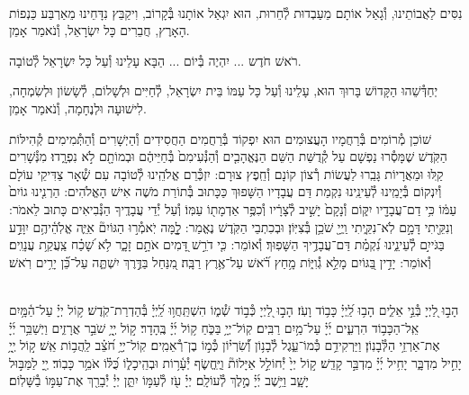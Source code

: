 \documentclass[twoside, openany, parskip=half, 11pt]{book}
\begin{document}
\\
נִסִּים לַאֲבוֹתֵינוּ, וְ֯גָאַל אוֹתָם מֵעַבְדוּת לְ֯חֵרוּת, הוּא יִגְאַל אוֹתָנוּ בְּ֯קָרוֹב, וִיקַבֵּץ נִדָּחֵינוּ מֵאַרְבַּע כַּנְפוֹת הָאָרֶץ, חֲבֵרִים כָּל יִשְׂרָאֵל, וְ֯נֹאמַר אָמֵן.

רֹאשׁ חֹדֶש ... יִהְיֶה בְּ֯יוֹם ... הַבָּא עָלֵינוּ וְ֯עַל כָּל יִשְׂרָאֵל לְ֯טוֹבָה.

יְחַדְּ֯שֵׁהוּ הַקָּדוֹשׁ בָּרוּךְ הוּא, עָלֵינוּ וְ֯עַל כָּל עַמּוֹ בֵּית יִשְׂרָאֵל, לְ֯חַיִּים וּלְשָׁלוֹם, לְ֯שָׂשׂוֹן וּלְשִׂמְחָה, לִישׁוּעָה וּלְנֶחָמָה, וְ֯נֹאמַר אָמֵן.

\sepline

שׁוֹכֵן מְ֯רוֹמִים בְּ֯רַחֲמָיו הָעֲצוּמִים הוּא יִפְקוֹד בְּ֯רַחֲמִים הַחֲסִידִים וְ֯הַיְשָׁרִים וְ֯הַתְּ֯מִימִים קְ֯הִילּוֹת הַקֹּֽדֶשׁ שֶׁמָּסְ֯רוּ נַפְשָׁם עַל קְ֯דֻשַּׁת הַשֵּׁם הַנֶּאֱהָבִ֤ים וְ֯הַנְּ֯עִימִם֙ בְּ֯חַיֵּיהֶ֔ם וּבְמוֹתָ֖ם לֹ֣א נִפְרָ֑דוּ׃ מִנְּ֯שָׁרִים קַֽלּוּ וּמֵאֲרָיוֹת גָּבֵֽרוּ לַעֲשׂוֹת רְ֯צוֹן קוֹנָם וְ֯חֵֽפֶץ צוּרָם: יִזְכְּ֯רֵם אֱלֹהֵֽינוּ לְ֯טוֹבָה עִם שְׁ֯אָר צַדִּיקֵי עוֹלָם וְ֯יִנְקוֹם בְּ֯יָמֵֽינוּ לְ֯עֵינֵֽינוּ נִקְמַת דַּם עֲבָדָיו הַשָּׁפוּךְ כַּכָּתוּב בְּ֯תוֹרַת מֹשֶׁה אִישׁ הָאֱלֹהִים: הַרְנִ֤ינוּ גוֹיִם֙ עַמּ֔וֹ כִּ֥י דַם־עֲבָדָ֖יו יִקּ֑וֹם וְ֯נָקָם֙ יָשִׁ֣יב לְ֯צָרָ֔יו וְ֯כִפֶּ֥ר אַדְמָת֖וֹ עַמּֽוֹ׃ וְ֯עַל יְ֯דֵי עֲבָדֶֽיךָ הַנְּ֯בִיאִים כָּתוּב לֵאמֹר: וְנִקֵּ֖יתִי דָּמָ֣ם לֹֽא־נִקֵּ֑יתִי וַֽיְיָ֖ שֹׁכֵ֥ן בְּ֯צִיּֽוֹן׃ וּבְכִתְבֵי הַקֹּֽדֶשׁ נֶאֱמַר: לׇׇׇ֤מָּה יֹֽאמְ֯ר֣וּ הַגּוֹיִם֘ אַיֵּ֢ה אֱלֹֽהֵ֫יהֶ֥ם יִוָּדַ֣ע בַּגֹּייִ֣ם לְ֯עֵינֵ֑ינוּ נִ֝קְמַ֗ת דַּם־עֲבָדֶ֥יךָ הַשָּׁפֽוּךְ׃ וְ֯אוֹמֵר: כִּ֤י דֹרֵ֣שׁ דָּ֭מִים אֹתָ֣ם זָכָ֑ר לֹ֥א שָׁ֝כַ֗ח צַֽעֲקַ֥ת עֲנָוִֽים׃ וְ֯אוֹמֵר: יָדִ֣ין בַּ֭גּוֹיִם מָלֵ֣א גְ֯וִיּ֑וֹת מָ֥חַץ רֹ֝֗אשׁ עַל־אֶ֥רֶץ רַבָּֽה׃ מִ֭נַּחַל בַּדֶּ֣רֶךְ יִשְׁתֶּ֑ה עַל־כֵּ֝֗ן יָרִ֥ים רֹֽאשׁ׃



\vspace{-0.5\baselineskip}
\ashrei


\yehalelu

\\
%
הָב֣וּ לַ֭יְיָ בְּ֯נֵ֣י אֵלִ֑ים הָב֥וּ לַֽ֝יְיָ֗ כָּב֥וֹד וָעֹֽז׃
הָב֣וּ לַ֭יְיָ כְּ֯ב֣וֹד שְׁ֯מ֑וֹ הִשְׁתַּֽחֲו֥וּ לַֽ֝יְיָ֗ בְּ֯הַדְרַת־קֹֽדֶשׁ׃
ק֥וֹל יְיָ֗ עַל־הַ֫מָּ֥יִם אֵֽל־הַכָּב֥וֹד הִרְעִ֑ים יְ֜יָ֗ עַל־מַ֥יִם רַבִּֽים׃
קֽוֹל־יְיָ֥ בַּכֹּ֑חַ ק֥וֹל יְ֜יָ֗ בֶּֽהָדָר׃
ק֣וֹל יְ֖יָ֥ שֹׁבֵ֣ר אֲרָזִ֑ים וַיְשַׁבֵּ֥ר יְ֜יָ֗ אֶת־אַרְזֵ֥י הַלְּ֯בָנֽוֹן׃
וַיַּרְקִידֵ֥ם כְּ֯מוֹ־עֵ֑גֶל לְ֯בָנ֥וֹן וְ֝֯שִׂרְי֗וֹן כְּ֯מ֣וֹ בֶן־רְ֯אֵמִֽים׃
קֽוֹל־יְיָ֥ חֹ֝צֵ֗ב לַֽהֲב֥וֹת אֵֽשׁ׃
ק֣וֹל יְ֖יָ֥ יָחִ֣יל מִדְבָּ֑ר יָחִ֥יל יְ֜יָ֗ מִדְבַּ֣ר קָדֵֽשׁ׃
ק֣וֹל יְיָ֙ יְ֯חוֹלֵ֣ל אַיָּלוֹת֘ וַיֶּֽחֱשׂ֢ף יְ֯עָ֫ר֥וֹת וּבְהֵֽיכָל֑וֹ כֻּ֝לּ֗וֹ אֹמֵ֥ר כָּבֽוֹד׃
יְ֖יָ לַמַּבּ֣וּל יָשָׁ֑ב וַיֵּ֥שֶׁב יְ֜יָ֗ מֶ֣לֶךְ לְ֯עוֹלָֽם׃
יְיָ֗ עֹ֖ז לְ֯עַמּ֣וֹ יִתֵּ֑ן יְיָ֓ יְ֯בָרֵ֖ךְ אֶת־עַמּ֣וֹ בַ֯שָּׁלֽוֹם׃
\end{document}
